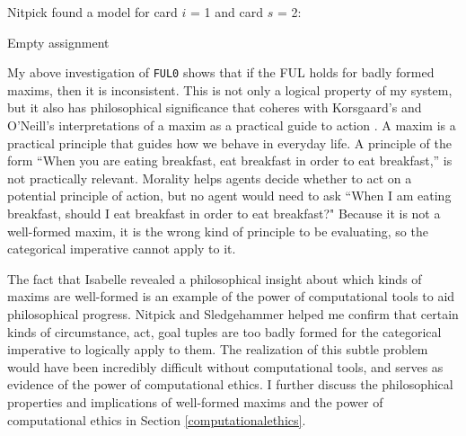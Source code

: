 \begin{isabellebody}
{\color{blue} Nitpick found a model for card $i$ = 1 and card $s$ = 2:

  Empty assignment \color{black}%
}%
\endisatagproof
{\isafoldproof}%
%
\isadelimproof
%
\endisadelimproof
%
\begin{isamarkuptext}%
My above investigation of \texttt{FUL0} shows that if the FUL holds for badly formed maxims, then 
it is inconsistent. This is not only a logical property of my system, but it also has philosophical
significance that coheres with Korsgaard's and O'Neill's interpretations of a maxim as a practical
guide to action \citep{actingforareason,actingonprinciple}. A maxim is a practical principle that guides how we behave in everyday life. A 
principle of the form ``When you are eating breakfast, eat breakfast in order to eat breakfast,'' is not 
practically relevant. Morality helps agents decide
whether to act on a potential principle of action, but no agent would need to ask
``When I am eating breakfast, should I eat breakfast in order to eat breakfast?" Because it is not a 
well-formed maxim, it is the wrong kind of principle to be evaluating, so the categorical imperative 
cannot apply to it. 

The fact that Isabelle revealed a philosophical insight about which kinds of maxims are well-formed
is an example of the power of computational tools to aid
philosophical progress. Nitpick and Sledgehammer helped me confirm that certain kinds
of circumstance, act, goal tuples are too badly formed for the categorical imperative to logically 
apply to them. The realization of this subtle problem would have been incredibly difficult without 
computational tools, and serves as evidence of the power of computational ethics. I further discuss the philosophical
properties and implications of well-formed maxims and the power of computational ethics in 
Section \ref{computationalethics}.


\end{isamarkuptext}
\end{isabellebody}
